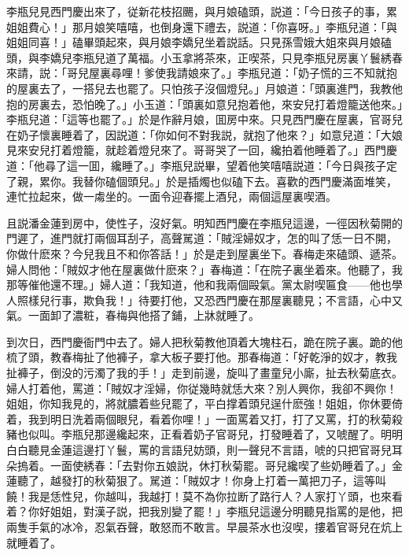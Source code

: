 李瓶兒見西門慶出來了，従新花枝招颺，與月娘磕頭，説道：「今日孩子的事，累姐姐費心！」那月娘笑嘻嘻，也倒身還下禮去，説道：「你喜呀。」李瓶兒道：「與姐姐同喜！」磕畢頭起來，與月娘李嬌兒坐着説話。只見孫雪娥大姐來與月娘磕頭，與李嬌兒李瓶兒道了萬福。小玉拿將茶來，正喫茶，只見李瓶兒房裏丫鬟綉春來請，説：「哥兒屋裏尋哩！爹使我請娘來了。」李瓶兒道：「奶子慌的三不知就抱的屋裏去了，一搭兒去也罷了。只怕孩子沒個燈兒。」月娘道：「頭裏進門，我教他抱的房裏去，恐怕晚了。」小玉道：「頭裏如意兒抱着他，來安兒打着燈籠送他來。」李瓶兒道：「這等也罷了。」於是作辭月娘，囬房中來。只見西門慶在屋裏，官哥兒在奶子懷裏睡着了，因説道：「你如何不對我説，就抱了他來？」如意兒道：「大娘見來安兒打着燈籠，就趁着燈兒來了。哥哥哭了一回，纔拍着他睡着了。」西門慶道：「他尋了這一囬，纔睡了。」李瓶兒説畢，望着他笑嘻嘻説道：「今日與孩子定了親，累你。我替你磕個頭兒。」於是插燭也似磕下去。喜歡的西門慶滿面堆笑，連忙拉起來，做一䖏坐的。一面令迎春擺上酒兒，兩個這屋裏喫酒。

且説潘金蓮到房中，使性子，沒好氣。明知西門慶在李瓶兒這邊，一徑因秋菊開的門遲了，進門就打兩個耳刮子，高聲駡道：「賊淫婦奴才，怎的叫了恁一日不開，你做什麽來？今兒我且不和你答話！」於是走到屋裏坐下。春梅走來磕頭、遞茶。婦人問他：「賊奴才他在屋裏做什麽來？」春梅道：「在院子裏坐着來。他聽了，我那等催他還不理。」婦人道：「我知道，他和我兩個毆氣。黨太尉喫匾食——他也學人照樣兒行事，欺負我！」待要打他，又恐西門慶在那屋裏聽見；不言語，心中又氣。一面卸了濃粧，春梅與他搭了鋪，上牀就睡了。

到次日，西門慶衙門中去了。婦人把秋菊教他頂着大塊柱石，跪在院子裏。跪的他梳了頭，教春梅扯了他褲子，拿大板子要打他。那春梅道：「好乾淨的奴才，教我扯褲子，倒没的污濁了我的手！」走到前邊，旋叫了畫童兒小廝，扯去秋菊底衣。婦人打着他，罵道：「賊奴才淫婦，你従幾時就恁大來？別人興你，我卻不興你！姐姐，你知我見的，將就膿着些兒罷了，平白撑着頭兒逞什麽強！姐姐，你休要倚着，我到明日洗着兩個眼兒，看着你哩！」一面罵着又打，打了又罵，打的秋菊殺豬也似叫。李瓶兒那邊纔起來，正看着奶子官哥兒，打發睡着了，又唬醒了。明明白白聽見金蓮這邊打丫鬟，罵的言語兒妨頭，則一聲兒不言語，唬的只把官哥兒耳朵摀着。一面使綉春：「去對你五娘説，休打秋菊罷。哥兒纔喫了些奶睡着了。」金蓮聽了，越發打的秋菊狠了。駡道：「賊奴才！你身上打着一萬把刀子，這等叫饒！我是恁性兒，你越叫，我越打！莫不為你拉断了路行人？人家打丫頭，也來看着？你好姐姐，對漢子説，把我別變了罷！」李瓶兒這邊分明聽見指罵的是他，把兩隻手氣的冰冷，忍氣吞聲，敢怒而不敢言。早晨茶水也沒喫，摟着官哥兒在炕上就睡着了。

